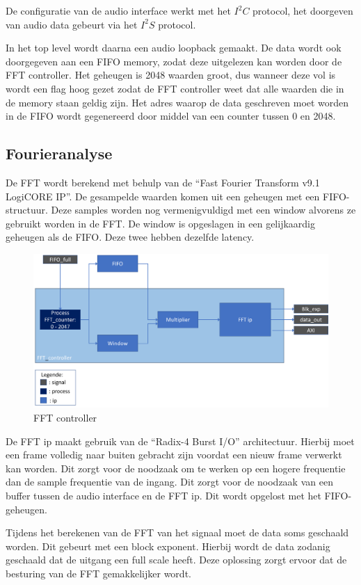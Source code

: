 \documentclass[a4paper,kul]{kulakarticle} %
\begin{document}
De configuratie van de audio interface werkt met het $I^2C$ protocol, het doorgeven van audio data gebeurt via het $I^2S$ protocol.\newline

In het top level wordt daarna een audio loopback gemaakt. De data wordt ook doorgegeven aan een FIFO memory, zodat deze uitgelezen kan worden door de FFT controller. Het geheugen is 2048 waarden groot, dus wanneer deze vol is wordt een flag hoog gezet zodat de FFT controller weet dat alle waarden die in de memory staan geldig zijn. Het adres waarop de data geschreven moet worden in de FIFO wordt gegenereerd door middel van een counter tussen 0 en 2048. 

\subsection{Fourieranalyse}

De FFT wordt berekend met behulp van de “Fast Fourier Transform v9.1 LogiCORE IP”. De gesampelde waarden komen uit een geheugen met een FIFO-structuur. Deze samples worden nog vermenigvuldigd met een window alvorens ze gebruikt worden in de FFT. De window is opgeslagen in een gelijkaardig geheugen als de FIFO. Deze twee hebben dezelfde latency.

\begin{figure}[H]
	\centering
	\includegraphics[width=0.7\linewidth]{FFT_controller.png}
	\caption{FFT controller}
	\label{fig:fft_controller}
\end{figure}

De FFT ip maakt gebruik van de “Radix-4 Burst I/O” architectuur. Hierbij moet een frame volledig naar buiten gebracht zijn voordat een nieuw frame verwerkt kan worden. Dit zorgt voor de noodzaak om te werken op een hogere frequentie dan de sample frequentie van de ingang. Dit zorgt voor de noodzaak van een buffer tussen de audio interface en de FFT ip. Dit wordt opgelost met het FIFO-geheugen.

Tijdens het berekenen van de FFT van het signaal moet de data soms geschaald worden. Dit gebeurt met een block exponent. Hierbij wordt de data zodanig geschaald dat de uitgang een full scale heeft. Deze oplossing zorgt ervoor dat de besturing van de FFT gemakkelijker wordt.\\
\end{document}
